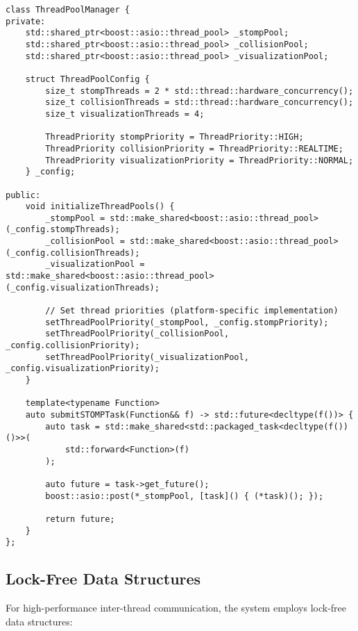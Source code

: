 \begin{lstlisting}[caption={Advanced Thread Pool Management}, label={lst:thread_pool}]
class ThreadPoolManager {
private:
    std::shared_ptr<boost::asio::thread_pool> _stompPool;
    std::shared_ptr<boost::asio::thread_pool> _collisionPool;
    std::shared_ptr<boost::asio::thread_pool> _visualizationPool;
    
    struct ThreadPoolConfig {
        size_t stompThreads = 2 * std::thread::hardware_concurrency();
        size_t collisionThreads = std::thread::hardware_concurrency();
        size_t visualizationThreads = 4;
        
        ThreadPriority stompPriority = ThreadPriority::HIGH;
        ThreadPriority collisionPriority = ThreadPriority::REALTIME;
        ThreadPriority visualizationPriority = ThreadPriority::NORMAL;
    } _config;
    
public:
    void initializeThreadPools() {
        _stompPool = std::make_shared<boost::asio::thread_pool>(_config.stompThreads);
        _collisionPool = std::make_shared<boost::asio::thread_pool>(_config.collisionThreads);
        _visualizationPool = std::make_shared<boost::asio::thread_pool>(_config.visualizationThreads);
        
        // Set thread priorities (platform-specific implementation)
        setThreadPoolPriority(_stompPool, _config.stompPriority);
        setThreadPoolPriority(_collisionPool, _config.collisionPriority);
        setThreadPoolPriority(_visualizationPool, _config.visualizationPriority);
    }
    
    template<typename Function>
    auto submitSTOMPTask(Function&& f) -> std::future<decltype(f())> {
        auto task = std::make_shared<std::packaged_task<decltype(f())()>>(
            std::forward<Function>(f)
        );
        
        auto future = task->get_future();
        boost::asio::post(*_stompPool, [task]() { (*task)(); });
        
        return future;
    }
};
\end{lstlisting}

\subsection{Lock-Free Data Structures}

For high-performance inter-thread communication, the system employs lock-free data structures:

